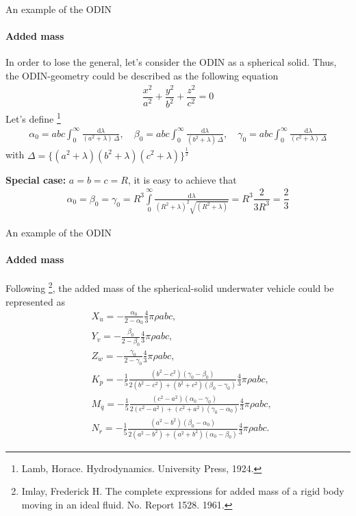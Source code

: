 \begin{frame}{An example of the ODIN}
	\framesubtitle{Added mass}
	In order to lose the general, let's consider the ODIN as a spherical solid. Thus, the ODIN-geometry could be described as the following equation
	\begin{align}
		\dfrac{x^2}{a^2} + \dfrac{y^2}{b^2} + \dfrac{z^2}{c^2} = 0
	\end{align}
	Let's define \footnote{Lamb, Horace. Hydrodynamics. University Press, 1924.}
	\begin{align}
		\alpha_0 = abc \int_0^\infty \frac{\mathrm{d}\lambda}{(a^2 + \lambda) \, \Delta}, \quad
		\beta_0 = abc \int_0^\infty \frac{\mathrm{d}\lambda}{(b^2 + \lambda) \, \Delta}, \quad
		\gamma_0 = abc \int_0^\infty \frac{\mathrm{d}\lambda}{(c^2 + \lambda) \, \Delta}
	\end{align}
	with $\Delta = \big\{(a^2 + \lambda)(b^2 + \lambda)(c^2 + \lambda)\big\}^{\frac{1}{2}}$
	
	\textbf{Special case:} $a = b = c = R$, it is easy to achieve that 
	\begin{align}
		\alpha_0 = \beta_0 = \gamma_0 = R^3 \int\limits_0^\infty \frac{\mathrm{d}\lambda}{(R^2 + \lambda)^2\sqrt{(R^2 + \lambda)}} = R^3\dfrac{2}{3R^3} = \dfrac{2}{3}
	\end{align}
\end{frame}








\begin{frame}{An example of the ODIN}
	\framesubtitle{Added mass}
	Following \footnote{Imlay, Frederick H. The complete expressions for added mass of a rigid body moving in an ideal fluid. No. Report 1528. 1961.}, the added mass of the spherical-solid underwater vehicle could be represented as
	\begin{align}
		&X_{\dot{u}} = -\frac{\alpha_0}{2 - \alpha_0} \frac{4}{3} \pi \rho abc,\\
		&Y_{\dot{v}} = -\frac{\beta_0}{2 - \beta_0} \frac{4}{3} \pi \rho abc,\\
		&Z_{\dot{w}} = -\frac{\gamma_0}{2 - \gamma_0} \frac{4}{3} \pi \rho abc,\\
		&K_{\dot{p}} = -\frac{1}{5} \frac{(b^2 - c^2)(\gamma_0 - \beta_0)}{2(b^2 - c^2) + (b^2 + c^2)(\beta_0 - \gamma_0)} \frac{4}{3} \pi \rho abc,\\
		&M_{\dot{q}} = -\frac{1}{5} \frac{(c^2 - a^2)(\alpha_0 - \gamma_0)}{2(c^2 - a^2) + (c^2 + a^2)(\gamma_0 - \alpha_0)} \frac{4}{3} \pi \rho abc,\\
		&N_{\dot{r}} = -\frac{1}{5} \frac{(a^2 - b^2)(\beta_0 - \alpha_0)}{2(a^2 - b^2) + (a^2 + b^2)(\alpha_0 - \beta_0)} \frac{4}{3} \pi \rho abc.
	\end{align}
\end{frame}




